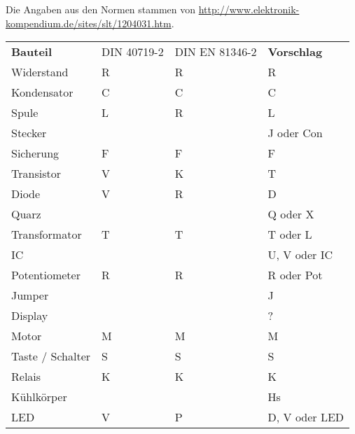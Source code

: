 Die Angaben aus den Normen stammen von 
\url{http://www.elektronik-kompendium.de/sites/slt/1204031.htm}. 
\begin{table}[h!]
  \begin{tabular}{llll}
  \rowcolor{white}  \textbf{Bauteil} 	  & DIN 40719-2   & DIN EN 81346-2    & \textbf{Vorschlag}\\
  \rowcolor{lgray}  Widerstand            & R             & R                 & R \\
  \rowcolor{white}  Kondensator           & C             & C                 & C \\
  \rowcolor{lgray}  Spule                 & L             & R                 & L \\
  \rowcolor{white}  Stecker               &               &                   & J oder Con \\
  \rowcolor{lgray}  Sicherung             & F             & F                 & F \\
  \rowcolor{white}  Transistor            & V             & K                 & T \\
  \rowcolor{lgray}  Diode                 & V             & R                 & D \\
  \rowcolor{white}  Quarz                 &               &                   & Q oder X \\
  \rowcolor{lgray}  Transformator         & T             & T                 & T oder L \\
  \rowcolor{white}  IC                    &               &                   & U, V oder IC \\
  \rowcolor{lgray}  Potentiometer         & R             & R                 & R oder Pot \\
  \rowcolor{white}  Jumper                &               &                   & J \\
  \rowcolor{lgray}  Display               &               &                   & ? \\
  \rowcolor{white}  Motor                 & M             & M                 & M \\
  \rowcolor{lgray}  Taste / Schalter      & S             & S                 & S \\
  \rowcolor{white}  Relais                & K             & K                 & K \\
  \rowcolor{lgray}  Kühlkörper            &               &                   & Hs \\
  \rowcolor{white}  LED                   & V             & P                 & D, V oder LED \\

\end{tabular}
\end{table}
